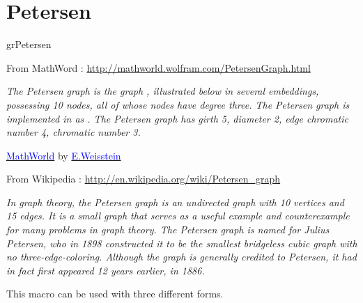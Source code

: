 \newpage\section{Petersen}\label{petersen} 
\begin{NewMacroBox}{grPetersen}{}

\medskip
From MathWord : \url{http://mathworld.wolfram.com/PetersenGraph.html}

\emph{The Petersen graph is the graph , illustrated below in several embeddings, possessing 10 nodes, all of whose nodes have degree three. The Petersen graph is implemented in  as .
The Petersen graph has girth 5, diameter 2, edge chromatic number 4, chromatic number 3.}

\href{http://mathworld.wolfram.com/topics/GraphTheory.html}%
           {\textcolor{blue}{MathWorld}} by \href{http://en.wikipedia.org/wiki/Eric_W._Weisstein}%
           {\textcolor{blue}{E.Weisstein}}   

From Wikipedia : \url{http://en.wikipedia.org/wiki/Petersen_graph}

\emph{In graph theory, the Petersen graph is an undirected graph with 10 vertices and 15 edges. It is a small graph that serves as a useful example and counterexample for many problems in graph theory. The Petersen graph is named for Julius Petersen, who in 1898 constructed it to be the smallest bridgeless cubic graph with no three-edge-coloring. Although the graph is generally credited to Petersen, it had in fact first appeared 12 years earlier, in 1886.}

This macro can be used with three different forms.
\end{NewMacroBox}

 \subsection{}
\begin{center}
\begin{tkzexample}[latex=8cm]
\end{tkzexample} 
\end{center}
\vfill\newpage
